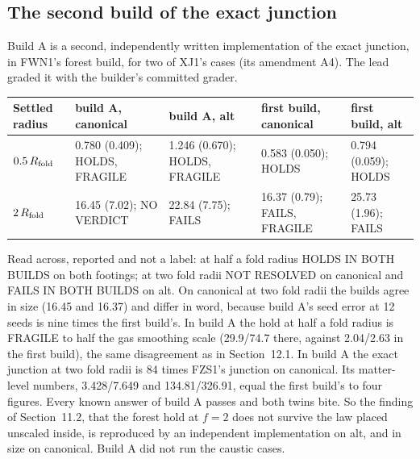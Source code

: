 \documentclass[10pt]{article}
\begin{document}
\subsection{The second build of the exact junction}
Build A is a second, independently written implementation of the exact junction, in FWN1's forest build, for two of XJ1's cases (its amendment A4). The lead graded it with the builder's committed grader.
{\small
\begin{longtable}{@{}p{2.0cm}p{3.7cm}p{3.7cm}p{3.0cm}p{3.0cm}@{}}\toprule
Settled radius & build A, canonical & build A, alt & first build, canonical & first build, alt\\\midrule\endhead
$0.5\,R_{\rm fold}$ & 0.780 (0.409); HOLDS, FRAGILE & 1.246 (0.670); HOLDS, FRAGILE & 0.583 (0.050); HOLDS & 0.794 (0.059); HOLDS\\
$2\,R_{\rm fold}$ & 16.45 (7.02); NO VERDICT & 22.84 (7.75); FAILS & 16.37 (0.79); FAILS, FRAGILE & 25.73 (1.96); FAILS\\\bottomrule
\end{longtable}}
Read across, reported and not a label: at half a fold radius HOLDS IN BOTH BUILDS on both footings; at two fold radii NOT RESOLVED on canonical and FAILS IN BOTH BUILDS on alt. On canonical at two fold radii the builds agree in size (16.45 and 16.37) and differ in word, because build A's seed error at 12 seeds is nine times the first build's. In build A the hold at half a fold radius is FRAGILE to half the gas smoothing scale (29.9/74.7 there, against 2.04/2.63 in the first build), the same disagreement as in Section~12.1. In build A the exact junction at two fold radii is 84 times FZS1's junction on canonical. Its matter-level numbers, 3.428/7.649 and 134.81/326.91, equal the first build's to four figures. Every known answer of build A passes and both twins bite. So the finding of Section~11.2, that the forest hold at $f=2$ does not survive the law placed unscaled inside, is reproduced by an independent implementation on alt, and in size on canonical. Build A did not run the caustic cases.
\end{document}
